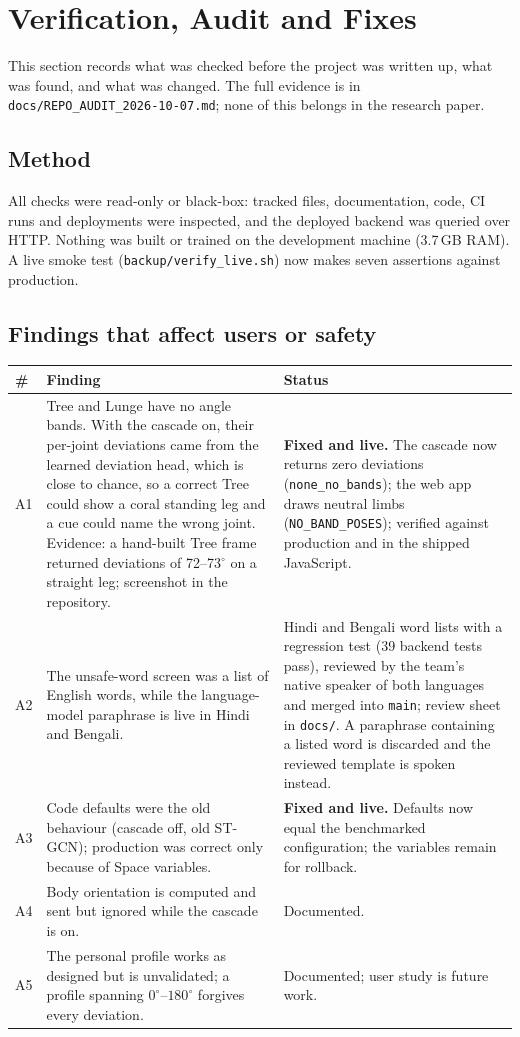 \section{Verification, Audit and Fixes}\label{sec:audit}
This section records what was checked before the project was written up, what was found, and what was changed. The full evidence is in \texttt{docs/REPO\_AUDIT\_2026-10-07.md}; none of this belongs in the research paper.

\subsection{Method}
All checks were read-only or black-box: tracked files, documentation, code, CI runs and deployments were inspected, and the deployed backend was queried over HTTP. Nothing was built or trained on the development machine (3.7\,GB RAM). A live smoke test (\texttt{backup/verify\_live.sh}) now makes seven assertions against production.

\subsection{Findings that affect users or safety}
\begin{table}[h]
\centering\footnotesize
\begin{tabularx}{\textwidth}{@{}p{0.7cm}Xp{4.2cm}@{}}
\toprule
\# & Finding & Status \\ \midrule
A1 & Tree and Lunge have no angle bands. With the cascade on, their per-joint deviations came from the learned deviation head, which is close to chance, so a correct Tree could show a coral standing leg and a cue could name the wrong joint. Evidence: a hand-built Tree frame returned deviations of 72--73$^\circ$ on a straight leg; screenshot in the repository. & \textbf{Fixed and live.} The cascade now returns zero deviations (\texttt{none\_no\_bands}); the web app draws neutral limbs (\texttt{NO\_BAND\_POSES}); verified against production and in the shipped JavaScript. \\
A2 & The unsafe-word screen was a list of English words, while the language-model paraphrase is live in Hindi and Bengali. & Hindi and Bengali word lists with a regression test (39 backend tests pass), reviewed by the team's native speaker of both languages and merged into \texttt{main}; review sheet in \texttt{docs/}. A paraphrase containing a listed word is discarded and the reviewed template is spoken instead. \\
A3 & Code defaults were the old behaviour (cascade off, old ST-GCN); production was correct only because of Space variables. & \textbf{Fixed and live.} Defaults now equal the benchmarked configuration; the variables remain for rollback. \\
A4 & Body orientation is computed and sent but ignored while the cascade is on. & Documented. \\
A5 & The personal profile works as designed but is unvalidated; a profile spanning $0^\circ$--$180^\circ$ forgives every deviation. & Documented; user study is future work. \\ \bottomrule
\end{tabularx}
\end{table}

